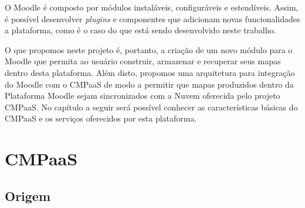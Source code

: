 \documentclass[
	12pt,				%
	openright,			%
	oneside,			%
	a4paper,			%
	english,			%
	french,				%
	spanish,			%
	brazil				%
	]{abntex2}
\begin{document}
O Moodle é composto por módulos instaláveis, configuráveis e estendíveis. Assim, é possível desenvolver \textit{plugins} e componentes que adicionam novas funcionalidades a plataforma, como é o caso do que está sendo desenvolvido neste trabalho.

O que propomos neste projeto é, portanto, a criação de um novo módulo para o Moodle que permita ao usuário construir, armazenar e recuperar seus mapas dentro desta plataforma. Além disto, propomos uma arquitetura para integração do Moodle com o CMPaaS de modo a permitir que mapas produzidos dentro da Plataforma Moodle sejam sincronizados com a Nuvem oferecida pelo projeto CMPaaS. No capítulo a seguir será possível conhecer as características básicas do CMPaaS e os serviços oferecidos por esta plataforma.

\begin{table}[htb]
\end{table}




\chapter{CMPaaS}
\section{Origem}
\end{document}
